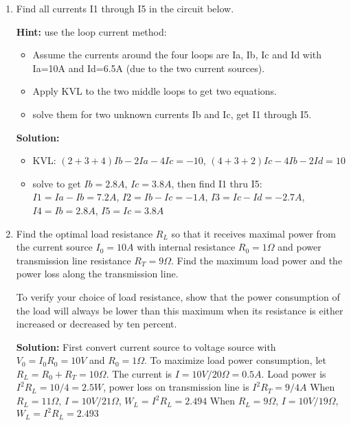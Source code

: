 \begin{enumerate}

{\bf Solution:}
\begin{itemize}
\item KCL equations: $I1+I2+I3-I0=0$, $-I3+I4+I5=0$
\item $I1=V1/R1$, $I2=V1/R2$, $I3=(V1-V2)/R3$, $I4=V2/R4$, $I5=(V2+V0)/R5$
\item substitute I1 through I5 into KCL equations and solve for V1 and V2 
	to get: $V1=21.8V$, $V2=-21.8V$
\item obtain all currents: $I1=1.09$, $I2=0.545$, $I3=4.36$, $I4=-1.09$, $I5=5.46$
\end{itemize}

\item Find all currents I1 through I5 in the circuit below. 

{\bf Hint:} use the loop current method: 

\begin{itemize}
\item Assume the currents around the four loops are Ia, Ib, Ic and Id 
  with Ia=10A and Id=6.5A (due to the two current sources).
\item Apply KVL to the two middle loops to get two equations.
\item solve them for two unknown currents Ib and Ic, get I1 through I5.
\end{itemize}


{\bf Solution:}
\begin{itemize}
\item KVL: $(2+3+4)Ib-2Ia-4Ic=-10$, $(4+3+2)Ic-4Ib-2Id=10$
\item solve to get $Ib=2.8A$, $Ic=3.8A$, then find I1 thru I5:
	$I1=Ia-Ib=7.2A$, $I2=Ib-Ic=-1A$, $I3=Ic-Id=-2.7A$, $I4=Ib=2.8A$,
	$I5=Ic=3.8A$
\end{itemize}

\item Find the optimal load resistance $R_L$ so that it receives maximal
power from the current source $I_0=10A$ with internal resistance 
$R_0=1\Omega$ and power transmission line resistance $R_T=9\Omega$. 
Find the maximum load power and the power loss along the transmission 
line.


To verify your choice of load resistance, show that the power consumption
of the load will always be lower than this maximum when its resistance is 
either increased or decreased by ten percent.

{\bf Solution:}
First convert current source to voltage source with $V_0=I_0 R_0=10V$
and $R_0=1 \Omega$. To maximize load power consumption, let 
$R_L=R_0+R_T=10 \Omega$. The current is $I=10V/20\Omega=0.5A$. Load power 
is $I^2R_L=10/4=2.5W$, power loss on transmission line is $I^2R_T=9/4A$
When $R_L=11\Omega$, $I=10V/21\Omega$, $W_L=I^2 R_L=2.494$
When $R_L=9\Omega$, $I=10V/19\Omega$, $W_L=I^2 R_L=2.493$

\end{enumerate}



